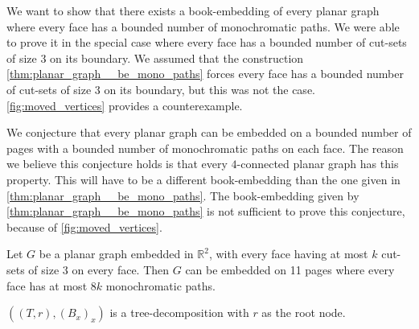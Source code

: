 We want to show that there exists a book-embedding of every planar graph where every face has a bounded number of monochromatic paths. We were able to prove it in the special case where every face has a bounded number of cut-sets of size 3 on its boundary. We assumed that the construction \cref{thm:planar_graph__be_mono_paths} forces every face has a bounded number of cut-sets of size 3 on its boundary, but this was not the case. \cref{fig:moved_vertices} provides a counterexample. 

We conjecture that every planar graph can be embedded on a bounded number of pages with a bounded number of monochromatic paths on each face. The reason we believe this conjecture holds is that every $4$-connected planar graph has this property.
This will have to be a different book-embedding than the one given in \cref{thm:planar_graph__be_mono_paths}. The book-embedding given by \cref{thm:planar_graph__be_mono_paths} is not sufficient to prove this conjecture, because of \cref{fig:moved_vertices}.  

\begin{theorem}\label{thm:planar_graph__be_mono_paths}
	Let \( G \) be a planar graph embedded in $\mathbb{R}^2$, with every face having at most $k$ cut-sets of size $3$ on every face. Then $G$ can be embedded on 11 pages where every face has at most $8k$ monochromatic paths. 
\end{theorem}

$ ((T,r), (B_x)_x)$ is a tree-decomposition with $r$ as the root node. 

